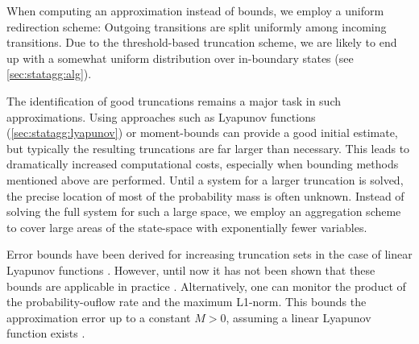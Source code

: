 When computing an approximation instead of bounds, we employ a uniform redirection scheme:
Outgoing transitions are split uniformly among incoming transitions.
Due to the threshold-based truncation scheme, we are likely to end up with a somewhat uniform distribution over in-boundary states (see \autoref{sec:statagg:alg}).


The identification of good truncations remains a major task in such approximations.
Using approaches such as Lyapunov functions (\autoref{sec:statagg:lyapunov}) \parencite{dayar2011bounding} or moment-bounds \parencite{kuntz2021approximations} can provide a good initial estimate, but typically the resulting truncations are far larger than necessary.
This leads to dramatically increased computational costs, especially when bounding methods mentioned above are performed.
Until a system for a larger truncation is solved, the precise location of  most of the probability mass is often unknown.
Instead of solving the full system for such a large space, we employ an aggregation scheme to cover large areas of the state-space with exponentially fewer variables.

Error bounds have been derived for increasing  truncation sets 
in the case of linear Lyapunov functions  \parencite{gupta2017finite}.
However, until now it has not been shown that these bounds are applicable in practice \parencite{meyn1994computable}.
Alternatively, one can monitor the product of the probability-ouflow rate and the maximum L1-norm.
This bounds the approximation error up to a constant $M>0$, assuming a linear Lyapunov function exists \parencite{gupta2017finite}.



